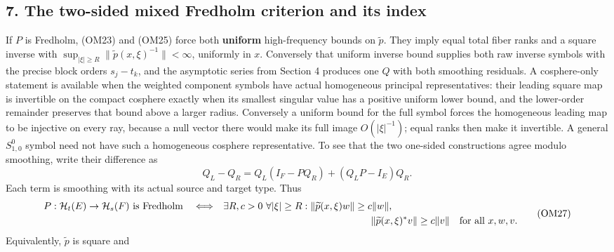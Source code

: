 \documentclass[
  11pt,
]{article}
\makeatletter
\let\ReaderOriginalAnchorStart\hyper@anchorstart
\let\ReaderOriginalAnchorEnd\hyper@anchorend
\let\ReaderPendingAliases\@empty
\def\ReaderArmAliases#1{\gdef\ReaderPendingAliases{#1}}
\def\hyper@anchorstart#1{\ReaderIfNativeAnchorTF{#1}{\ReaderPendingAliases\global\let\ReaderPendingAliases\@empty}{}\ReaderOriginalAnchorStart{#1}}
\makeatother
\begin{document}
\ReaderArmAliases{\ReaderOriginalAnchorStart{AN03-OMF-007}\ReaderOriginalAnchorEnd\begingroup\expandafter\def\csname @currentHref\endcsname{AN03-OMF-007}\label{AN03-OMF-007}\endgroup\ReaderOriginalAnchorStart{7-the-two-sided-mixed-fredholm-criterion-and-its-index}\ReaderOriginalAnchorEnd\begingroup\expandafter\def\csname @currentHref\endcsname{7-the-two-sided-mixed-fredholm-criterion-and-its-index}\label{7-the-two-sided-mixed-fredholm-criterion-and-its-index}\endgroup}
\subsection{7. The two-sided mixed Fredholm criterion and its
index}\label{the-two-sided-mixed-fredholm-criterion-and-its-index}

If \(P\) is Fredholm, (OM23) and (OM25) force both \textbf{uniform}
high-frequency bounds on \(\widetilde p\). They imply equal total fiber
ranks and a square inverse with
\(\sup_{|\xi|\ge R}\|\widetilde p(x,\xi)^{-1}\|<\infty\), uniformly in
\(x\). Conversely that uniform inverse bound supplies both raw inverse
symbols with the precise block orders \(s_j-t_k\), and the asymptotic
series from Section 4 produces one \(Q\) with both smoothing residuals.
A cosphere-only statement is available when the weighted component
symbols have actual homogeneous principal representatives: their leading
square map is invertible on the compact cosphere exactly when its
smallest singular value has a positive uniform lower bound, and the
lower-order remainder preserves that bound above a larger radius.
Conversely a uniform bound for the full symbol forces the homogeneous
leading map to be injective on every ray, because a null vector there
would make its full image \(O(|\xi|^{-1})\); equal ranks then make it
invertible. A general \(S^0_{1,0}\) symbol need not have such a
homogeneous cosphere representative. To see that the two one-sided
constructions agree modulo smoothing, write their difference as \[
 Q_L-Q_R=Q_L(I_F-PQ_R)+(Q_LP-I_E)Q_R.
 \tag{OM26}
\] Each term is smoothing with its actual source and target type. Thus
{\footnotesize
\[
 \begin{aligned}
 P:\mathcal H_t(E)\to\mathcal H_s(F)\text{ is Fredholm}
 \quad\Longleftrightarrow\quad&
 \exists R,c>0\ \forall |\xi|\ge R:
 \|\widetilde p(x,\xi)w\|\ge c\|w\|,\\
 &\hspace{53mm}
 \|\widetilde p(x,\xi)^*v\|\ge c\|v\|
 \quad\text{for all }x,w,v .
 \end{aligned}
 \tag{OM27}
\]
} Equivalently, \(\widetilde p\) is square and
\end{document}
